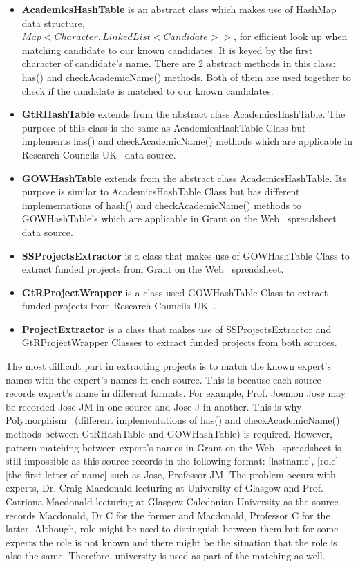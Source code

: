 \begin{itemize}
 \item \textbf{AcademicsHashTable} is an abstract class which makes use of HashMap data structure, \\ 
 $Map<Character, LinkedList<Candidate>>$, for efficient look up when matching candidate to our
known candidates. It is keyed by the first character of candidate's name. There are 2 abstract methods in this class: has() and checkAcademicName() methods.
Both of them are used together to check if the candidate is matched to our known candidates.
\item \textbf{GtRHashTable} extends from the abstract class AcademicsHashTable. The purpose of this class is the same as AcademicsHashTable Class but
implements has() and checkAcademicName() methods which are applicable in Research Councils UK~\cite{gtr} data source.
\item \textbf{GOWHashTable} extends from the abstract class AcademicsHashTable. Its purpose is similar to AcademicsHashTable Class but
has different implementations of hash() and checkAcademicName() methods to GOWHashTable's which are applicable in Grant on the Web~\cite{gow} spreadsheet data source.
\item \textbf{SSProjectsExtractor} is a class that makes use of GOWHashTable Class to extract funded projects from Grant on the Web~\cite{gow} spreadsheet.
\item \textbf{GtRProjectWrapper} is a class used GOWHashTable Class to extract funded projects from Research Councils UK~\cite{gtr}.
\item \textbf{ProjectExtractor} is a class that makes use of SSProjectsExtractor and GtRProjectWrapper Classes to extract funded projects from both sources.
\end{itemize}

The most difficult part in extracting projects is to match the known expert's names with the expert's names in each source. This is because each source
records expert's name in different formats. For example, Prof. Joemon Jose may be recorded Jose JM in one source and Jose J in another. This is why Polymorphism~\cite{polymorphism} 
(different implementations of has() and checkAcademicName() methods between GtRHashTable and GOWHashTable) is required. However, pattern matching between
expert's names in Grant on the Web~\cite{gow} spreadsheet is still impossible as this source records in the following format: 
[lastname], [role] [the first letter of name] such as Jose, Professor JM. The problem occurs with experts, Dr. Craig Macdonald lecturing at
University of Glasgow and Prof. Catriona Macdonald lecturing at Glasgow Caledonian University
as the source records Macdonald, Dr C for the former and Macdonald, Professor C for the latter. Although, role might be used to distinguish between them but
for some experts the role is not known and there might be the situation that the role is also the same. 
Therefore, university is used as part of the matching as well.

